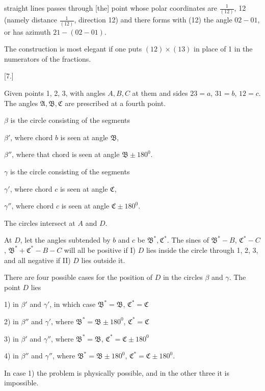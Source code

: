 %
straight lines passes through [the] point whose polar coordinates are $\frac{1}{(12)}$, 12 (namely distance $\frac{1}{(12)}$, direction 12) and there forms with (12) the angle $02-01$, or has azimuth $21-(02-01)$.

The construction is most elegant if one puts $(12)\times(13)$ in place of 1 in the numerators of the fractions.

\medskip

\begin{center}[7.]\end{center}

Given points 1, 2, 3, with angles $A, B, C$ at them and sides $23=a$, $31=b$, $12=c$. The angles $\mathfrak{A}, \mathfrak{B}, \mathfrak{C}$ are prescribed at a fourth point.

$\beta$ is the circle consisting of the segments

$\beta'$, where chord $b$ is seen at angle $\mathfrak{B}$,

$\beta''$, where that chord is seen at angle $\mathfrak{B}\pm180^0$.

$\gamma$ is the circle consisting of the segments

$\gamma'$, where chord $c$ is seen at angle $\mathfrak{C}$,

$\gamma''$, where chord $c$ is seen at angle $\mathfrak{C}\pm180^0$.

The circles intersect at $A$ and $D$.

At $D$, let the angles subtended by $b$ and $c$ be $\mathfrak{B}^*, \mathfrak{C}^*$. The sines of $\mathfrak{B}^*-B$, $\mathfrak{C}^*-C$, $\mathfrak{B}^*+\mathfrak{C}^*-B-C$ will all be positive if I) $D$ lies inside the circle through 1, 2, 3, and all negative if II) $D$ lies outside it.

There are four possible cases for the position of $D$ in the circles $\beta$ and $\gamma$. The point $D$ lies

1) in $\beta'$ and $\gamma'$, in which case $\mathfrak{B}^*=\mathfrak{B}$, $\mathfrak{C}^*=\mathfrak{C}$

2) in $\beta''$ and $\gamma'$, where $\mathfrak{B}^*=\mathfrak{B}\pm180^0$, $\mathfrak{C}^*=\mathfrak{C}$

3) in $\beta'$ and $\gamma''$, where $\mathfrak{B}^*=\mathfrak{B}$, $\mathfrak{C}^*=\mathfrak{C}\pm180^0$

4) in $\beta''$ and $\gamma''$, where $\mathfrak{B}^*=\mathfrak{B}\pm180^0$, $\mathfrak{C}^*=\mathfrak{C}\pm180^0$.

In case 1) the problem is physically possible, and in the other three it is impossible.
